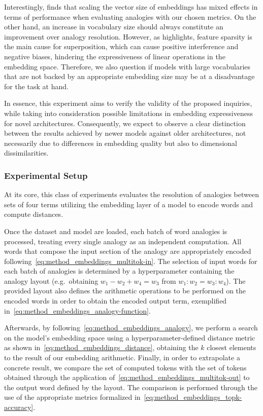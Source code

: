 Interestingly, \citet{drozd2016} finds that scaling the vector size of embeddings has mixed effects in terms of performance when evaluating analogies with our chosen metrics.
On the other hand, an increase in vocabulary size should always constitute an improvement over analogy resolution.
However, as \citet{elhage2022} highlights, feature sparsity is the main cause for superposition, which can cause positive interference and negative biases, hindering the expressiveness of linear operations in the embedding space.
Therefore, we also question if models with large vocabularies that are not backed by an appropriate embedding size may be at a disadvantage for the task at hand.

In essence, this experiment aims to verify the validity of the proposed inquiries, while taking into consideration possible limitations in embedding expressiveness for novel architectures.
Consequently, we expect to observe a clear distinction between the results achieved by newer models against older architectures, not necessarily due to differences in embedding quality but also to dimensional dissimilarities.

\subsubsection{Experimental Setup}\label{sssec:exp_emb_exp1_expset}

At its core, this class of experiments evaluates the resolution of analogies between sets of four terms utilizing the embedding layer of a model to encode words and compute distances.

Once the dataset and model are loaded, each batch of word analogies is processed, treating every single analogy as an independent computation.
All words that compose the input section of the analogy are appropriately encoded following~\cref{eq:method_embeddings_multitok-in}.
The selection of input words for each batch of analogies is determined by a hyperparameter containing the analogy layout (e.g.\ obtaining $w_1 - w_2 + w_4 = w_3$ from $w_1 : w_2 = w_3 : w_4$).
The provided layout also defines the arithmetic operations to be performed on the encoded words in order to obtain the encoded output term, exemplified in~\cref{eq:method_embeddings_analogy-function}.

Afterwards, by following~\cref{eq:method_embeddings_analogy}, we perform a search on the model's embedding space using a hyperparameter-defined distance metric as shown in~\cref{eq:method_embeddings_distance}, obtaining the $k$ closest elements to the result of our embedding arithmetic.
Finally, in order to extrapolate a concrete result, we compare the set of computed tokens with the set of tokens obtained through the application of~\cref{eq:method_embeddings_multitok-out} to the output word defined by the layout.
The comparison is performed through the use of the appropriate metrics formalized in~\cref{eq:method_embeddings_topk-accuracy}.

